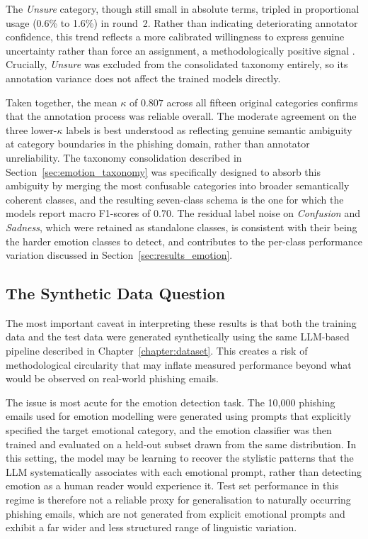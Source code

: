 The \textit{Unsure} category, though still small in absolute terms, tripled in proportional
usage (0.6\% to 1.6\%) in round~2. Rather than indicating deteriorating annotator
confidence, this trend reflects a more calibrated willingness to express genuine uncertainty
rather than force an assignment, a methodologically positive signal
\cite{artstein2017annotation}. Crucially, \textit{Unsure} was excluded from the
consolidated taxonomy entirely, so its annotation variance does not affect the trained
models directly.

Taken together, the mean $\kappa$ of $0.807$ across all fifteen original categories
confirms that the annotation process was reliable overall. The moderate agreement on the
three lower-$\kappa$ labels is best understood as reflecting genuine semantic ambiguity at
category boundaries in the phishing domain, rather than annotator unreliability. The
taxonomy consolidation described in Section~\ref{sec:emotion_taxonomy} was specifically
designed to absorb this ambiguity by merging the most confusable categories into broader
semantically coherent classes, and the resulting seven-class schema is the one for which
the models report macro F1-scores of 0.70. The residual label noise on \textit{Confusion}
and \textit{Sadness}, which were retained as standalone classes, is consistent with
their being the harder emotion classes to detect, and contributes to the per-class
performance variation discussed in Section~\ref{sec:results_emotion}.

\subsection{The Synthetic Data Question}

The most important caveat in interpreting these results is that both the training data and the test data were generated synthetically using the same LLM-based pipeline described in Chapter~\ref{chapter:dataset}. This creates a risk of methodological circularity that may inflate measured performance beyond what would be observed on real-world phishing emails.

The issue is most acute for the emotion detection task. The 10,000 phishing emails used for emotion modelling were generated using prompts that explicitly specified the target emotional category, and the emotion classifier was then trained and evaluated on a held-out subset drawn from the same distribution. In this setting, the model may be learning to recover the stylistic patterns that the LLM systematically associates with each emotional prompt, rather than detecting emotion as a human reader would experience it. Test set performance in this regime is therefore not a reliable proxy for generalisation to naturally occurring phishing emails, which are not generated from explicit emotional prompts and exhibit a far wider and less structured range of linguistic variation.

